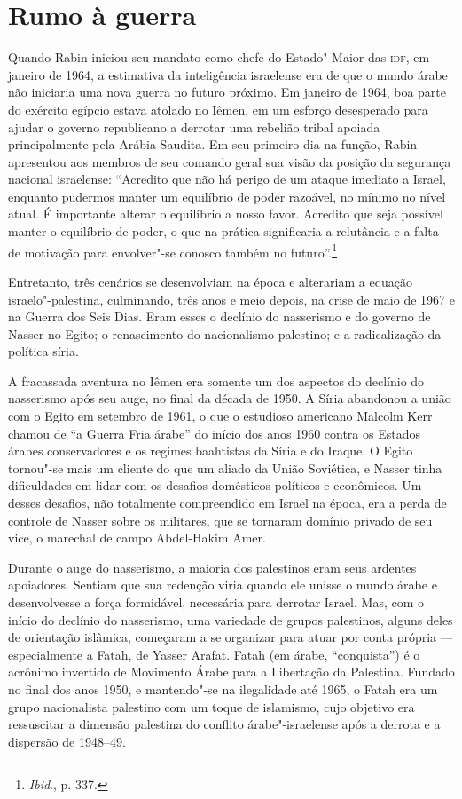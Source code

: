 \section{Rumo à guerra}

Quando Rabin iniciou seu mandato como chefe do Estado"-Maior das \textsc{idf}, em
janeiro de 1964, a estimativa da inteligência israelense era de que o
mundo árabe não iniciaria uma nova guerra no futuro próximo. Em janeiro
de 1964, boa parte do exército egípcio estava atolado no Iêmen, em um
esforço desesperado para ajudar o governo republicano a derrotar uma
rebelião tribal apoiada principalmente pela Arábia Saudita. Em seu
primeiro dia na função, Rabin apresentou aos membros de seu comando
geral sua visão da posição da segurança nacional israelense: ``Acredito
que não há perigo de um ataque imediato a Israel, enquanto pudermos
manter um equilíbrio de poder razoável, no mínimo no nível atual. É
importante alterar o equilíbrio a nosso favor. Acredito que seja
possível manter o equilíbrio de poder, o que na prática significaria a
relutância e a falta de motivação para envolver"-se conosco também no
futuro''.\footnote{\textit{Ibid}., p. 337.}

Entretanto, três cenários se desenvolviam na época e alterariam a
equação israelo"-palestina, culminando, três anos e meio depois, na crise
de maio de 1967 e na Guerra dos Seis Dias. Eram esses o declínio do
nasserismo e do governo de Nasser no Egito; o renascimento do
nacionalismo palestino; e a radicalização da política síria.

A fracassada aventura no Iêmen era somente um dos aspectos do declínio
do nasserismo após seu auge, no final da década de 1950. A Síria
abandonou a união com o Egito em setembro de 1961, o que o
estudioso americano Malcolm Kerr chamou de ``a Guerra Fria árabe'' do
início dos anos 1960 contra os Estados árabes conservadores e os regimes
baahtistas da Síria e do Iraque. O Egito tornou"-se mais um cliente do que
um aliado da União Soviética, e Nasser tinha dificuldades em lidar com
os desafios domésticos políticos e econômicos. Um desses desafios, não
totalmente compreendido em Israel na época, era a perda de controle de
Nasser sobre os militares, que se tornaram domínio privado de seu vice,
o marechal de campo Abdel-Hakim Amer.

Durante o auge do nasserismo, a maioria dos palestinos eram seus
ardentes apoiadores. Sentiam que sua redenção viria quando ele
unisse o mundo árabe e desenvolvesse a força formidável, necessária para
derrotar Israel. Mas, com o início do declínio do nasserismo, uma
variedade de grupos palestinos, alguns deles de orientação islâmica,
começaram a se organizar para atuar por conta própria --- especialmente a
Fatah, de Yasser Arafat. Fatah (em árabe, ``conquista'') é o acrônimo
invertido de Movimento Árabe para a Libertação da Palestina. Fundado no
final dos anos 1950, e mantendo"-se na ilegalidade até 1965, o Fatah era
um grupo nacionalista palestino com um toque de islamismo, cujo objetivo
era ressuscitar a dimensão palestina do conflito árabe"-israelense após a
derrota e a dispersão de 1948--49.

